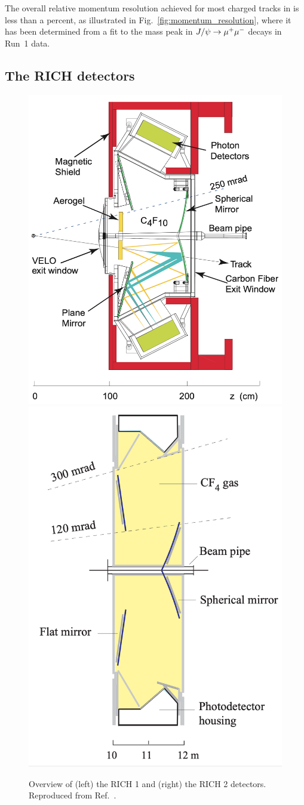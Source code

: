 The overall relative momentum resolution achieved for most charged tracks in \lhcb is less than a percent, as illustrated in Fig.~\ref{fig:momentum_resolution}, where it has been determined from a fit to the mass peak in $J/\psi\rightarrow{\ensuremath{\mu^+}}\mu^-$ decays in Run~1 data. 


\subsection{The RICH detectors} %
\label{sub:the_rich}

\begin{figure}[tb]
    \centering
    \includegraphics[width=0.45\columnwidth]{figures/detector/RICH1.png}
    \includegraphics[width=0.4\columnwidth]{figures/detector/RICH2.png}
    \caption{Overview of (left) the RICH 1 and (right) the RICH 2 detectors. Reproduced from Ref.~\cite{LHCb-detector,RICH-TDR}.}
    \label{fig:RICHes}
\end{figure}

